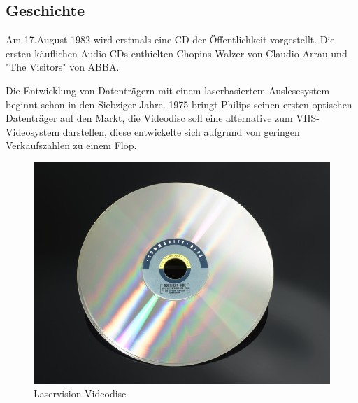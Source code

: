 \subsection{Geschichte}

Am 17.August 1982 wird erstmals eine CD der Öffentlichkeit vorgestellt. Die
ersten käuflichen Audio-CDs enthielten Chopins Walzer von Claudio Arrau und
"The Visitors" von ABBA.

Die Entwicklung von Datenträgern mit einem laserbasiertem Auslesesystem beginnt
schon in den Siebziger Jahre. 1975 bringt Philips seinen ersten optischen
Datenträger auf den Markt, die Videodisc soll eine alternative zum
VHS-Videosystem darstellen, diese entwickelte sich aufgrund von geringen
Verkaufszahlen zu einem Flop.

\begin{figure}[h]
  \begin{center}
      \begin{minipage}[t]{0.3\textwidth}
        \begin{center}
            \includegraphics[height=0.1\textheight]{Bilder/Optische_Datentraeger_Die_Compact_Disc/Geschichte/videodisc.png}
            \caption[Laservision Videodisc \newline \url{http://www.sciencemuseum.org.uk/online_science/explore_our_collections/objects/index/smxg-8095649}]{Laservision Videodisc}
            \label{fig:videodisc}
        \end{center}
      \end{minipage}
      \hspace{0.025\textwidth}
      \begin{minipage}[t]{0.3\textwidth}

\end{minipage}
\end{center}
\end{figure}
